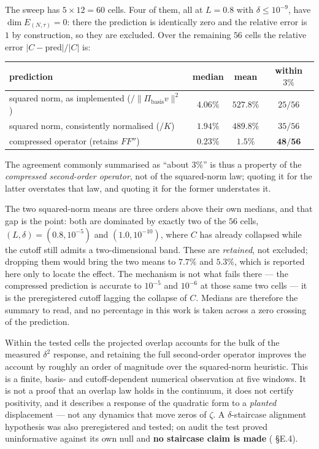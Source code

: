 The sweep has $5\times12=60$ cells. Four of them, all at $L=0.8$ with
$\delta\le10^{-9}$, have $\dim E_{(N,\tau)}=0$: there the prediction is identically zero and
the relative error is $1$ by construction, so they are excluded. Over the remaining $56$
cells the relative error $|C-\mathrm{pred}|/|C|$ is:

\begin{center}\small
\begin{tabular}{lccc}
\toprule
prediction & median & mean & within $3\%$\\
\midrule
squared norm, as implemented ($/\|\Pi_{\mathrm{basis}}v\|^{2}$) & $4.06\%$ & $527.8\%$ & $25/56$\\
squared norm, consistently normalised ($/K$) & $1.94\%$ & $489.8\%$ & $35/56$\\
compressed operator (retains $FF''$) & $\mathbf{0.23\%}$ & $\mathbf{1.5\%}$ & $\mathbf{48/56}$\\
\bottomrule
\end{tabular}
\end{center}

\noindent The agreement commonly summarised as ``about $3\%$'' is thus a property of the
\emph{compressed second-order operator}, not of the squared-norm law; quoting it for the
latter overstates that law, and quoting it for the former understates it.

The two squared-norm means are three orders above their own medians, and that gap is the
point: both are dominated by exactly two of the $56$ cells, $(L,\delta)=(0.8,10^{-5})$ and
$(1.0,10^{-10})$, where $C$ has already collapsed while the cutoff still admits a
two-dimensional band. These are \emph{retained}, not excluded; dropping them would bring the
two means to $7.7\%$ and $5.3\%$, which is reported here only to locate the effect. The
mechanism is not what fails there --- the compressed prediction is accurate to $10^{-5}$ and
$10^{-6}$ at those same two cells --- it is the preregistered cutoff lagging the collapse of
$C$. Medians are therefore the summary to read, and no percentage in this work is taken
across a zero crossing of the prediction.

\begin{remark}\label{pds:scope}
Within the tested cells the projected overlap accounts for the bulk of the measured
$\delta^{2}$ response, and retaining the full second-order operator improves the account by
roughly an order of magnitude over the squared-norm heuristic. This is a finite, basis- and
cutoff-dependent numerical observation at five windows. It is not a proof that an overlap
law holds in the continuum, it does not certify positivity, and it describes a response of
the quadratic form to a \emph{planted} displacement --- not any dynamics that move zeros of
$\zeta$. A $\delta$-staircase alignment hypothesis was also preregistered and tested; on
audit the test proved uninformative against its own null and \textbf{no staircase claim is
made} ( \S E.4).
\end{remark}

